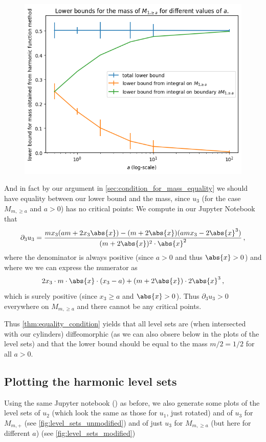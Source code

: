 \documentclass[titlepage,numbers=noenddot,oneside,%
cleardoublepage=empty,paper=a4,fontsize=11pt,%
english,%
]{scrartcl}
\newcommand*{\mathcomma}{\,,}
\begin{document}
\begin{figure}
    \centering
    \includegraphics[width=0.8\linewidth]{figures/lower_bounds_for_different_values_of_a.png}
    \caption{}
    \label{fig:lower_bounds_for_different_values_of_a}
\end{figure}

And in fact by our argument in \cref{sec:condition_for_mass_equality} we should have equality between our lower bound and the mass, since \( u_3 \) (for the case \( M_{m,\geq a} \) and \( a>0 \)) has no critical points: We compute in our Jupyter Notebook that
\begin{equation*}
    \partial_3 u_3=\frac{m x_{3}(a m + 2 x_{3} \abs{x}) -(m + 2 \abs{x}) (a m x_{3} - 2 \abs{x}^3)}{(m + 2 \abs{x})^{2} \cdot \abs{x}^2}\mathcomma
\end{equation*}
where the denominator is always positive (since \( a>0 \) and thus \( \abs{x}>0 \)) and where we we can express the numerator as
\begin{equation*}
    2x_3\cdot m\cdot \abs{x}\cdot (x_3-a)+(m+2\abs{x})\cdot 2\abs{x}^3\mathcomma
\end{equation*}
which is surely positive (since \( x_3\geq a \) and \( \abs{x}>0 \)). Thus \( \partial_3 u_3>0 \) everywhere on \( M_{m,\geq a} \) and there cannot be any critical points.

Thus \cref{thm:equality_condition} yields that all level sets are (when intersected with our cylinders) diffeomorphic (as we can also obsere below in the plots of the level sets) and that the lower bound should be equal to the mass \( m/2=1/2 \) for all \( a>0 \).

\subsection{Plotting the harmonic level sets}
Using the same Jupyter notebook (\cite{fischerhenryrubenHarmonicFunctionMethod2023}) as before, we also generate some plots of the level sets of \( u_2 \) (which look the same as those for \( u_1 \), just rotated) and of \( u_3 \) for \( M_{m,+} \) (see \cref{fig:level_sets_unmodified}) and of just \( u_3 \) for \( M_{m,\geq a} \) (but here for different \( a \)) (see \cref{fig:level_sets_modified})
\end{document}
